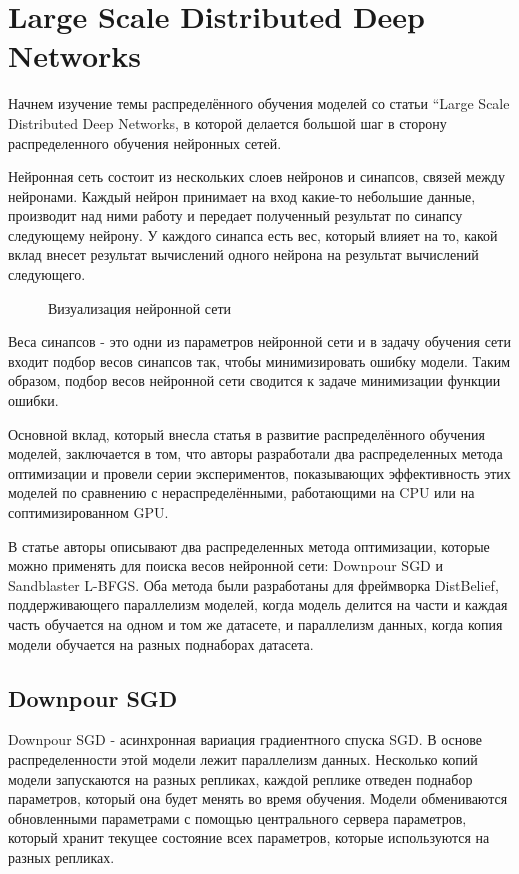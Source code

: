 
\section{Large Scale Distributed Deep Networks}
\indent\setlength{\parindent}{1em} 
Начнем изучение темы распределённого обучения моделей со статьи “Large Scale Distributed Deep Networks\cite{beginning}, в которой делается большой шаг в сторону распределенного обучения нейронных сетей. 

\indent\setlength{\parindent}{1em} 
Нейронная сеть состоит из нескольких слоев нейронов и синапсов, связей между нейронами. Каждый нейрон принимает на вход какие-то небольшие данные, производит над ними работу и передает полученный результат по синапсу следующему нейрону. У каждого синапса есть вес, который влияет на то, какой вклад внесет результат вычислений одного нейрона на результат вычислений следующего. 


\begin{figure}[h]%
	\centering
	\caption{Визуализация нейронной сети}
	\label{framework} %
\end{figure}

\indent\setlength{\parindent}{1em} 
Веса синапсов - это одни из параметров нейронной сети и в задачу обучения сети входит подбор весов синапсов так, чтобы минимизировать ошибку модели. Таким образом, подбор весов нейронной сети сводится к задаче минимизации функции ошибки.

\indent\setlength{\parindent}{1em} 
Основной вклад, который внесла статья в развитие распределённого обучения моделей, заключается в том, что авторы разработали два распределенных метода оптимизации и провели серии экспериментов, показывающих эффективность этих моделей по сравнению с нераспределёнными, работающими на CPU или на соптимизированном GPU.

\indent\setlength{\parindent}{1em} 
В статье авторы описывают два распределенных метода оптимизации, которые можно применять для поиска весов нейронной сети: Downpour SGD и Sandblaster L-BFGS. Оба метода были разработаны для фреймворка DistBelief, поддерживающего параллелизм моделей, когда модель делится на части и каждая часть обучается на одном и том же датасете, и параллелизм данных, когда копия модели обучается на разных поднаборах датасета. 

\subsection{Downpour SGD}
\indent\setlength{\parindent}{1em} 
Downpour SGD - асинхронная вариация градиентного спуска SGD. В основе распределенности этой модели лежит параллелизм данных. Несколько копий модели запускаются на разных репликах, каждой реплике отведен поднабор параметров, который она будет менять во время обучения. Модели обмениваются обновленными параметрами с помощью центрального сервера параметров, который хранит текущее состояние всех параметров, которые используются на разных репликах.

